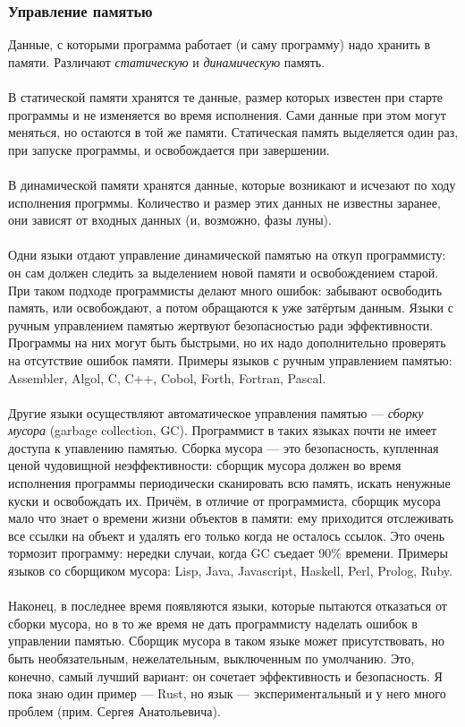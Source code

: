 \documentclass[11pt]{book}
\begin{document}
\subsubsection{Управление памятью}
Данные, с которыми программа работает (и саму программу) надо хранить в памяти.
Различают \emph{статическую} и \emph{динамическую} память.
\\ \\
В статической памяти хранятся те данные, размер которых известен при старте программы и не изменяется во время исполнения.
Сами данные при этом могут меняться, но остаются в той же памяти.
Статическая память выделяется один раз, при запуске программы, и освобождается при завершении.
\\ \\
В динамической памяти хранятся данные, которые возникают и исчезают по ходу исполнения прогрммы.
Количество и размер этих данных не известны заранее, они зависят от входных данных (и, возможно, фазы луны).
\\ \\
Одни языки отдают управление динамической памятью на откуп программисту: он сам должен следить за выделением новой памяти и освобождением старой.
При таком подходе программисты делают много ошибок: забывают освободить память,
или освобождают, а потом обращаются к уже затёртым данным.
Языки с ручным управлением памятью жертвуют безопасностью ради эффективности.
Программы на них могут быть быстрыми, но их надо дополнительно проверять на отсутствие ошибок памяти.
Примеры языков с ручным управлением памятью: Assembler, Algol, C, C++, Cobol, Forth, Fortran, Pascal.
\\ \\
Другие языки осуществляют автоматическое управления памятью --- \emph{сборку мусора} (garbage collection, GC).
Программист в таких языках почти не имеет доступа к упавлению памятью.
Сборка мусора --- это безопасность, купленная ценой чудовищной неэффективности:
сборщик мусора должен во время исполнения программы периодически сканировать всю память, искать ненужные куски и освобождать их.
Причём, в отличие от программиста, сборщик мусора мало что знает о времени жизни объектов в памяти:
ему приходится отслеживать все ссылки на объект и удалять его только когда не осталось ссылок.
Это очень тормозит программу: нередки случаи, когда GC съедает 90\% времени.
Примеры языков со сборщиком мусора: Lisp, Java, Javascript, Haskell, Perl, Prolog, Ruby.
\\ \\
Наконец, в последнее время появляются языки, которые пытаются отказаться от сборки мусора,
но в то же время не дать программисту наделать ошибок в управлении памятью.
Сборщик мусора в таком языке может присутствовать, но быть необязательным, нежелательным, выключенным по умолчанию.
Это, конечно, самый лучший вариант: он сочетает эффективность и безопасность.
Я пока знаю один пример --- Rust, но язык --- экспериментальный и у него много проблем (прим. Сергея Анатольевича).
\end{document}
